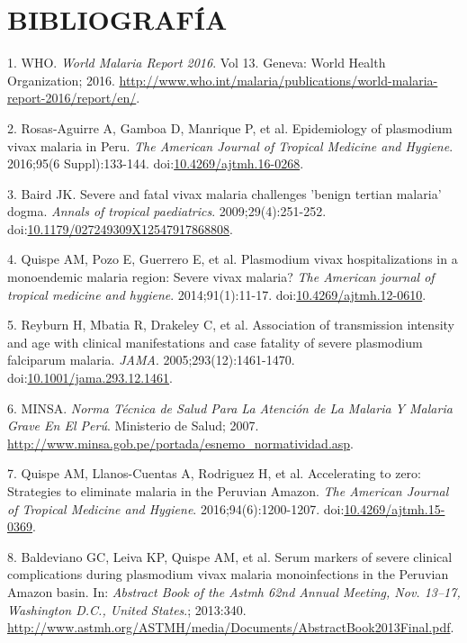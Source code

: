 \documentclass[]{article}
\begin{document}
\section{BIBLIOGRAFÍA}\label{bibliografia}

\hypertarget{refs}{}
\hypertarget{ref-WHO2016world}{}
1. WHO. \emph{World Malaria Report 2016}. Vol 13. Geneva: World Health
Organization; 2016.
\url{http://www.who.int/malaria/publications/world-malaria-report-2016/report/en/}.

\hypertarget{ref-rosas2016peru}{}
2. Rosas-Aguirre A, Gamboa D, Manrique P, et al. Epidemiology of
plasmodium vivax malaria in Peru. \emph{The American Journal of Tropical
Medicine and Hygiene}. 2016;95(6 Suppl):133-144.
doi:\href{https://doi.org/10.4269/ajtmh.16-0268}{10.4269/ajtmh.16-0268}.

\hypertarget{ref-baird2009}{}
3. Baird JK. Severe and fatal vivax malaria challenges 'benign tertian
malaria' dogma. \emph{Annals of tropical paediatrics}.
2009;29(4):251-252.
doi:\href{https://doi.org/10.1179/027249309X12547917868808}{10.1179/027249309X12547917868808}.

\hypertarget{ref-quispe2014}{}
4. Quispe AM, Pozo E, Guerrero E, et al. Plasmodium vivax
hospitalizations in a monoendemic malaria region: Severe vivax malaria?
\emph{The American journal of tropical medicine and hygiene}.
2014;91(1):11-17.
doi:\href{https://doi.org/10.4269/ajtmh.12-0610}{10.4269/ajtmh.12-0610}.

\hypertarget{ref-reyburn2015}{}
5. Reyburn H, Mbatia R, Drakeley C, et al. Association of transmission
intensity and age with clinical manifestations and case fatality of
severe plasmodium falciparum malaria. \emph{JAMA}.
2005;293(12):1461-1470.
doi:\href{https://doi.org/10.1001/jama.293.12.1461}{10.1001/jama.293.12.1461}.

\hypertarget{ref-norma2001}{}
6. MINSA. \emph{Norma Técnica de Salud Para La Atención de La Malaria Y
Malaria Grave En El Perú}. Ministerio de Salud; 2007.
\url{http://www.minsa.gob.pe/portada/esnemo_normatividad.asp}.

\hypertarget{ref-accelerate2016}{}
7. Quispe AM, Llanos-Cuentas A, Rodriguez H, et al. Accelerating to
zero: Strategies to eliminate malaria in the Peruvian Amazon. \emph{The
American Journal of Tropical Medicine and Hygiene}.
2016;94(6):1200-1207.
doi:\href{https://doi.org/10.4269/ajtmh.15-0369}{10.4269/ajtmh.15-0369}.

\hypertarget{ref-baldevi2013}{}
8. Baldeviano GC, Leiva KP, Quispe AM, et al. Serum markers of severe
clinical complications during plasmodium vivax malaria monoinfections in
the Peruvian Amazon basin. In: \emph{Abstract Book of the Astmh 62nd
Annual Meeting, Nov. 13--17, Washington D.C., United States}.; 2013:340.
\url{http://www.astmh.org/ASTMH/media/Documents/AbstractBook2013Final.pdf}.
\end{document}
